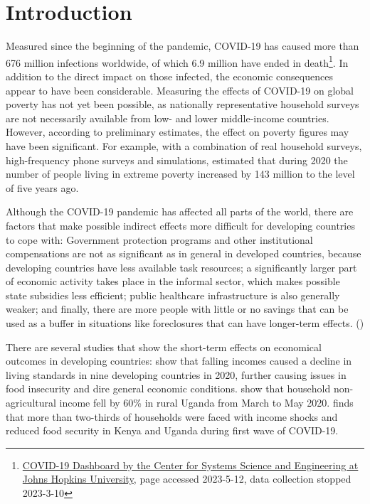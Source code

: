 \documentclass[12pt,a4paper,notitlepage]{article}
\begin{document}
{\let\clearpage\relax \tableofcontents} 

\thispagestyle{empty}

\clearpage


\setcounter{page}{6}

\section{Introduction} \label{sec:introduction}

Measured since the beginning of the pandemic, COVID-19 has caused more than 676 million infections worldwide, of which 6.9 million have ended in death\footnote{\href{https://coronavirus.jhu.edu/map.html}{ COVID-19 Dashboard by the Center for Systems Science and Engineering at Johns Hopkins University}, page accessed 2023-5-12, data collection stopped 2023-3-10}. In addition to the direct impact on those infected, the economic consequences appear to have been considerable. Measuring the effects of COVID-19 on global poverty has not yet been possible, as nationally representative household surveys are not necessarily available from low- and lower middle-income countries. However, according to preliminary estimates, the effect on poverty figures may have been significant. For example, with a combination of real household surveys, high-frequency phone surveys and simulations, \citet{Lakmer:2022} estimated that during 2020 the number of people living in extreme poverty increased by 143 million to the level of five years ago.

Although the COVID-19 pandemic has affected all parts of the world, there are factors that make possible indirect effects more difficult for developing countries to cope with: Government protection programs and other institutional compensations are not as significant as in general in developed countries, because developing countries have less available task resources; a significantly larger part of economic activity takes place in the informal sector, which makes possible state subsidies less efficient; public healthcare infrastructure is also generally weaker; and finally, there are more people with little or no savings that can be used as a buffer in situations like foreclosures that can have longer-term effects. (\citet{Bundervoet:2022,Egger:2021})

There are several studies that show the short-term effects on economical outcomes in developing countries: \citet{Egger:2021} show that falling incomes caused a decline in living standards in nine developing countries in 2020, further causing issues in food insecurity and dire general economic conditions. \citet{Mahmud:2021} show that household non-agricultural income fell by 60\% in rural Uganda from March to May 2020. \citet{Kansiime:2021} finds that more than two-thirds of households were faced with income shocks and reduced food security in Kenya and Uganda during first wave of COVID-19.
\end{document}

